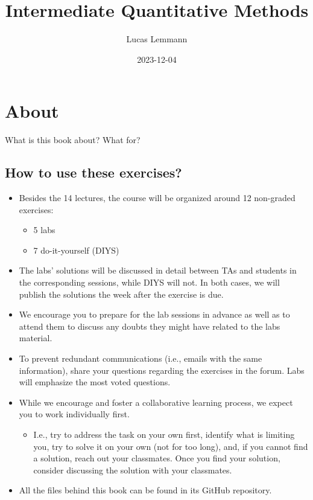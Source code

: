 \documentclass[
]{book}
\title{Intermediate Quantitative Methods}
\author{Lucas Lemmann}
\date{2023-12-04}
\providecommand{\tightlist}{%
  \setlength{\itemsep}{0pt}\setlength{\parskip}{0pt}}
\begin{document}
\maketitle

{
\setcounter{tocdepth}{1}
\tableofcontents
}
\hypertarget{about}{%
\chapter*{About}\label{about}}

What is this book about? What for?

\hypertarget{how-to-use-these-exercises}{%
\section{How to use these exercises?}\label{how-to-use-these-exercises}}

\begin{itemize}
\tightlist
\item
  Besides the 14 lectures, the course will be organized around 12 non-graded exercises:

  \begin{itemize}
  \tightlist
  \item
    5 labs
  \item
    7 do-it-yourself (DIYS)
  \end{itemize}
\item
  The labs' solutions will be discussed in detail between TAs and students in the corresponding sessions, while DIYS will not. In both cases, we will publish the solutions the week after the exercise is due.
\item
  We encourage you to prepare for the lab sessions in advance as well as to attend them to discuss any doubts they might have related to the labs material.
\item
  To prevent redundant communications (i.e., emails with the same information), share your questions regarding the exercises in the forum. Labs will emphasize the most voted questions.
\item
  While we encourage and foster a collaborative learning process, we expect you to work individually first.

  \begin{itemize}
  \tightlist
  \item
    I.e., try to address the task on your own first, identify what is limiting you, try to solve it on your own (not for too long), and, if you cannot find a solution, reach out your classmates. Once you find your solution, consider discussing the solution with your classmates.
  \end{itemize}
\item
  All the files behind this book can be found in its GitHub repository.
\end{itemize}
\end{document}
